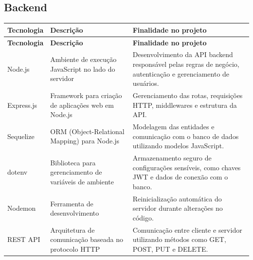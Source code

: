\documentclass[12pt]{article}
\begin{document}
\subsection{Backend}

\begin{longtable}{|p{3cm}|p{4.2cm}|p{7cm}|}
  \hline
  \textbf{Tecnologia}                                    & \textbf{Descrição} & \textbf{Finalidade no projeto}  \\
  \hline
  \endfirsthead

  \hline
  \textbf{Tecnologia}                                    & \textbf{Descrição} & \textbf{Finalidade no projeto}  \\
  \hline
  \endhead

  Node.js                                                &
  Ambiente de execução JavaScript no lado do servidor    &
  Desenvolvimento da API backend responsável pelas regras de negócio, autenticação e gerenciamento de usuários. \\
  \hline

  Express.js                                             &
  Framework para criação de aplicações web em Node.js    &
  Gerenciamento das rotas, requisições HTTP, middlewares e estrutura da API.                                    \\
  \hline

  Sequelize                                              &
  ORM (Object-Relational Mapping) para Node.js           &
  Modelagem das entidades e comunicação com o banco de dados utilizando modelos JavaScript.                     \\
  \hline

  dotenv                                                 &
  Biblioteca para gerenciamento de variáveis de ambiente &
  Armazenamento seguro de configurações sensíveis, como chaves JWT e dados de conexão com o banco.              \\
  \hline

  Nodemon                                                &
  Ferramenta de desenvolvimento                          &
  Reinicialização automática do servidor durante alterações no código.                                          \\
  \hline

  REST API                                               &
  Arquitetura de comunicação baseada no protocolo HTTP   &
  Comunicação entre cliente e servidor utilizando métodos como GET, POST, PUT e DELETE.                         \\
  \hline
\end{longtable}
\end{document}
